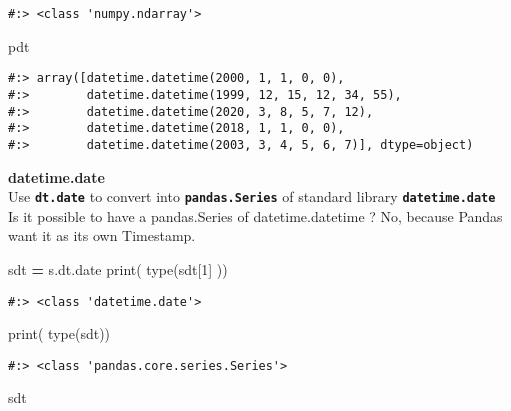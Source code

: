 \documentclass[
]{book}
\newenvironment{Shaded}{\begin{snugshade}}{\end{snugshade}}
\newcommand{\BuiltInTok}[1]{#1}
\newcommand{\DecValTok}[1]{\textcolor[rgb]{0.06,0.06,0.06}{#1}}
\newcommand{\NormalTok}[1]{#1}
\newcommand{\OperatorTok}[1]{\textcolor[rgb]{0.43,0.43,0.43}{\textbf{#1}}}
\begin{document}
\begin{verbatim}
#:> <class 'numpy.ndarray'>
\end{verbatim}

\begin{Shaded}
\begin{Highlighting}[]
\NormalTok{pdt}
\end{Highlighting}
\end{Shaded}

\begin{verbatim}
#:> array([datetime.datetime(2000, 1, 1, 0, 0),
#:>        datetime.datetime(1999, 12, 15, 12, 34, 55),
#:>        datetime.datetime(2020, 3, 8, 5, 7, 12),
#:>        datetime.datetime(2018, 1, 1, 0, 0),
#:>        datetime.datetime(2003, 3, 4, 5, 6, 7)], dtype=object)
\end{verbatim}

\textbf{datetime.date}\\
Use \textbf{\texttt{dt.date}} to convert into \textbf{\texttt{pandas.Series}} of standard library \textbf{\texttt{datetime.date}}\\
Is it possible to have a pandas.Series of datetime.datetime ? No, because Pandas want it as its own Timestamp.

\begin{Shaded}
\begin{Highlighting}[]
\NormalTok{sdt }\OperatorTok{=}\NormalTok{ s.dt.date}
\BuiltInTok{print}\NormalTok{( }\BuiltInTok{type}\NormalTok{(sdt[}\DecValTok{1}\NormalTok{] ))}
\end{Highlighting}
\end{Shaded}

\begin{verbatim}
#:> <class 'datetime.date'>
\end{verbatim}

\begin{Shaded}
\begin{Highlighting}[]
\BuiltInTok{print}\NormalTok{( }\BuiltInTok{type}\NormalTok{(sdt))}
\end{Highlighting}
\end{Shaded}

\begin{verbatim}
#:> <class 'pandas.core.series.Series'>
\end{verbatim}

\begin{Shaded}
\begin{Highlighting}[]
\NormalTok{sdt}
\end{Highlighting}
\end{Shaded}
\end{document}
